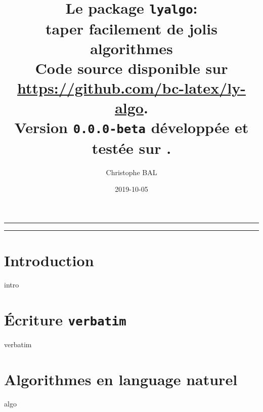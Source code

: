 \documentclass[12pt,a4paper]{article}
\begin{document}
\title{%
	Le package \texttt{lyalgo}:
	\\
	taper facilement de jolis algorithmes
	\\
	{
		\footnotesize Code source disponible
		sur \url{https://github.com/bc-latex/ly-algo}.%
	}
	\\
	{
		\footnotesize Version \texttt{0.0.0-beta}
		développée et testée sur \macosxname{}.%
	}
}

\author{Christophe BAL}
\date{2019-10-05}

\maketitle


\vspace{2em}

\hrule

\tableofcontents

\vspace{1.5em}

\hrule

\newpage





\section{Introduction}

{intro}







\section{Écriture \texttt{verbatim}}

{verbatim}




\section{Algorithmes en language naturel}

{algo}




%
\end{document}
